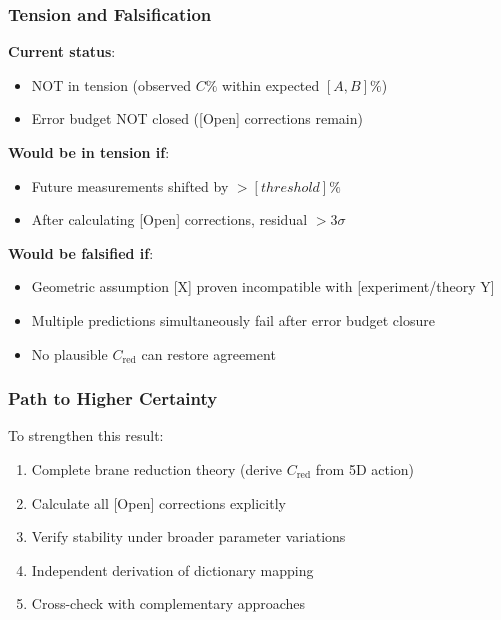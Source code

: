 
\subsubsection{Tension and Falsification}

\textbf{Current status}:
\begin{itemize}
\item NOT in tension (observed $C\%$ within expected $[A,B]\%$)
\item Error budget NOT closed ([Open] corrections remain)
\end{itemize}

\textbf{Would be in tension if}:
\begin{itemize}
\item Future measurements shifted by $> [threshold]\%$
\item After calculating [Open] corrections, residual $> 3\sigma$
\end{itemize}

\textbf{Would be falsified if}:
\begin{itemize}
\item Geometric assumption [X] proven incompatible with [experiment/theory Y]
\item Multiple predictions simultaneously fail after error budget closure
\item No plausible $C_{\mathrm{red}}$ can restore agreement
\end{itemize}


\subsubsection{Path to Higher Certainty}

To strengthen this result:
\begin{enumerate}
\item Complete brane reduction theory (derive $C_{\mathrm{red}}$ from 5D action)
\item Calculate all [Open] corrections explicitly
\item Verify stability under broader parameter variations
\item Independent derivation of dictionary mapping
\item Cross-check with complementary approaches
\end{enumerate}

